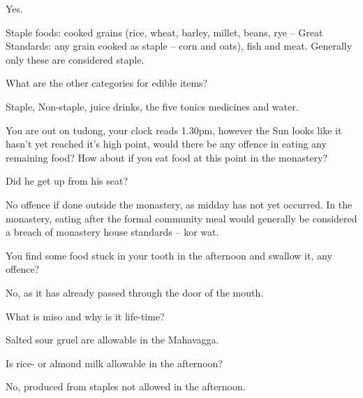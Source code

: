 \begin{solution}
  Yes.

  Staple foods: cooked grains (rice, wheat, barley, millet, beans, rye – Great
  Standards: any grain cooked as staple – corn and oats), fish and meat. Generally
  only these are considered staple.
\end{solution}

\bigskip

What are the other categories for edible items?

\begin{solution}
  Staple, Non-staple, juice drinks, the five tonics medicines and water.
\end{solution}

\bigskip

You are out on tudong, your clock reads 1.30pm, however the Sun looks like it
hasn't yet reached it's high point, would there be any offence in eating any
remaining food? How about if you eat food at this point in the monastery?

\begin{solution}
  Did he get up from his seat?

  No offence if done outside the monastery, as midday has not yet occurred. In
  the monastery, eating after the formal community meal would generally be
  considered a breach of monastery house standards – kor wat.
\end{solution}

\bigskip

You find some food stuck in your tooth in the afternoon and swallow it, any offence?

\begin{solution}
  No, as it has already passed through the door of the mouth.
\end{solution}

\bigskip

What is miso and why is it life-time?

\begin{solution}
  Salted sour gruel are allowable in the Mahavagga.
\end{solution}

\bigskip

Is rice- or almond milk allowable in the afternoon?

\begin{solution}
  No, produced from staples not allowed in the afternoon.
\end{solution}

